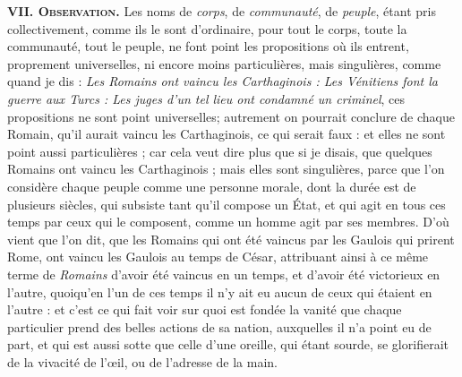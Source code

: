 \bigbreak
{\bfseries\scshape VII. Observation.} Les noms de \emph{corps}, de \emph{communauté}, de \emph{peuple}, étant pris collectivement, comme ils le sont d'ordinaire, pour tout le corps, toute la communauté, tout le peuple, ne font point les propositions où ils entrent, proprement universelles, ni encore moins particulières, mais singulières, comme quand je dis : \emph{Les Romains ont vaincu les Carthaginois : Les Vénitiens font la guerre aux Turcs : Les juges d'un tel lieu ont condamné un criminel}, ces propositions ne sont point universelles; autrement on pourrait conclure de chaque Romain, qu'il aurait vaincu les Carthaginois, ce qui serait faux : et elles ne sont point aussi particulières ; car cela veut dire plus que si je disais, que quelques Romains ont vaincu les Carthaginois ; mais elles sont singulières, parce que l'on considère chaque peuple comme une personne morale, dont la durée est de plusieurs siècles, qui subsiste tant qu'il compose un État, et qui agit en tous ces temps par ceux qui le composent, comme un homme agit par ses membres. D'où vient que l'on dit, que les Romains qui ont été vaincus par les Gaulois qui prirent Rome, ont vaincu les Gaulois au temps de César, attribuant ainsi à ce même terme de \emph{Romains} d'avoir été vaincus en un temps, et d'avoir été victorieux en l'autre, quoiqu'en l'un de ces temps il n'y ait eu aucun de ceux qui étaient en l'autre : et c'est ce qui fait voir sur quoi est fondée la vanité que chaque particulier prend des belles actions de sa nation, auxquelles il n'a point eu de part, et qui est aussi sotte que celle d'une oreille, qui étant sourde, se glorifierait de la vivacité de l'œil, ou de l'adresse de la main.

